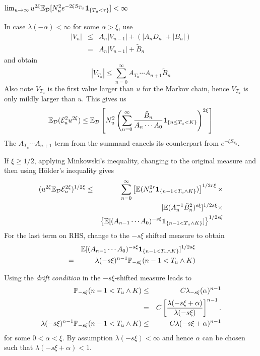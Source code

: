 \documentclass{beamer}
\begin{document}
\begin{frame}
  \frametitle{$\lim_{u \to \infty} u^{2\xi} \E_{\mathcal D}[N_u^2 e^{-2\xi
        S_{T_u}} \1{T_u < \tau}] < \infty$}
  In case $\lambda(-\alpha) < \infty$ for some $\alpha > \xi$, use
  \begin{eqnarray*}
    |V_n| &\leq& A_n|V_{n-1}| + (|A_n D_n| + |B_n|) \\
    &=& A_n |V_{n-1}| + \tilde B_n
  \end{eqnarray*}
  and obtain
  \[
  |V_{T_u}| \leq \sum_{n=0}^{\infty} A_{T_u} \cdots A_{n+1} \tilde B_n
  \]
  Also note $V_{T_u}$ is the first value larger than $u$ for the
  Markov chain, hence $V_{T_u}$ is only mildly larger than $u$. This
  gives us
  \[
  \E_{\mathcal D}(\mathcal E_u^2 u^{2\xi}) \leq
  \E_{\mathcal D} \left[
    N_u^2
    \left(
    \sum_{n=0}^{\infty} {
      \tilde B_n
      \over
      A_n \cdots A_0
    }
    \1{n \leq T_u < K}
    \right)^{2\xi}
    \right]
  \]
  The $A_{T_u} \cdots A_{n+1}$ term from the summand cancels its
  counterpart from $e^{-\xi S_{T_u}}$.
\end{frame}

\begin{frame}
  If $\xi \geq 1/2$, applying Minkowski's inequality, changing to
  the original measure and then using H\"older's inequality gives
  \begin{eqnarray*}
    (u^{2\xi} \E_{\mathcal D} \mathcal{E}^{2\xi}_u)^{1/2\xi} &\leq&
    \sum_{n=0}^\infty
    \left[\E (N_u^{2r} \1{n-1 < T_u \wedge K})\right]^{1/2r\xi} \times \\
    && [\E (A_n^{-1} \tilde B_n^2)^{s\xi}]^{1/2s\xi} \times \\
    && \left\{\E[
    (A_{n-1} \cdots A_0)^{-s\xi}
    \1{n-1 < T_u \wedge K}
    ]\right\}^{1/2s\xi}
  \end{eqnarray*}
  For the last term on RHS, change to the $-s\xi$ shifted measure to
  obtain
  \begin{eqnarray*}
  && \E[
  (A_{n-1} \cdots A_0)^{-s\xi}
  \1{n-1 < T_u \wedge K}
  ]^{1/2s\xi}\\
  &=& \lambda(-s\xi)^{n-1} \P_{-s\xi}(n-1 < T_u \wedge K)
  \end{eqnarray*}
\end{frame}

\begin{frame}
  Using the {\it drift condition} in the $-s\xi$-shifted measure leads to
  \begin{eqnarray*}
    \P_{-s\xi}(n-1 < T_u \wedge K) &\leq& C
    \lambda_{-s\xi}(\alpha)^{n-1} \\
    &=& C \left[
      {
      \lambda(-s\xi + \alpha)
      \over
      \lambda(-s\xi)
    }
    \right]^{n-1}. \\
    \lambda(-s\xi)^{n-1} \P_{-s\xi}(n-1 < T_u \wedge K) &\leq& C
    \lambda(-s\xi + \alpha)^{n-1}
  \end{eqnarray*}
  for some $0 < \alpha < \xi$. By assumption $\lambda(-s\xi) < \infty$
  and hence $\alpha$ can be chosen such that $\lambda(-s\xi + \alpha)
  < 1$.
\end{frame}
\end{document}
